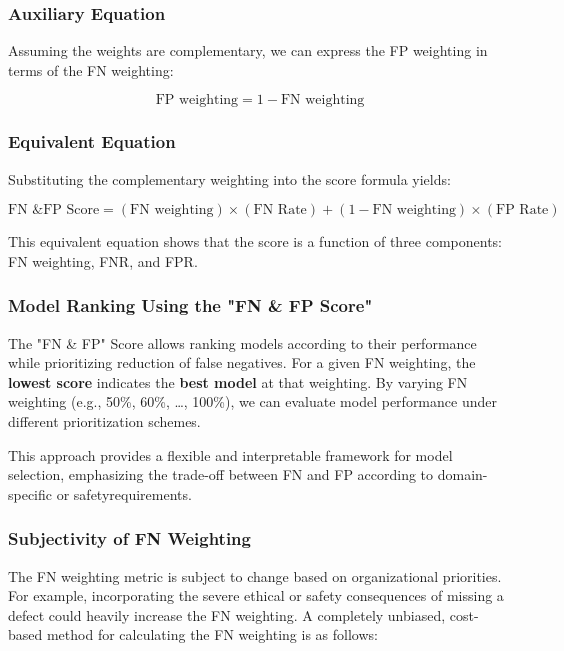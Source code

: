 \documentclass{article}
\begin{document}
\subsubsection{Auxiliary Equation}
Assuming the weights are complementary, we can express the FP weighting in terms of the FN weighting:

\begin{equation}
\text{FP weighting} = 1 - \text{FN weighting}
\end{equation}

\subsubsection{Equivalent Equation}
Substituting the complementary weighting into the score formula yields:

\begin{equation}
\text{FN \& FP Score} = (\text{FN weighting}) \times (\text{FN Rate}) + (1 - \text{FN weighting}) \times (\text{FP Rate})
\end{equation}

This equivalent equation shows that the score is a function of three components: FN weighting, FNR, and FPR.


\subsubsection{Model Ranking Using the "FN \& FP Score"}
The "FN \& FP" Score allows ranking models according to their performance while prioritizing reduction of false negatives. For a given FN weighting, the \textbf{lowest score} indicates the \textbf{best model} at that weighting.
By varying FN weighting (e.g., 50\%, 60\%, …, 100\%), we can evaluate model performance under different prioritization schemes.


This approach provides a flexible and interpretable framework for model selection, emphasizing the trade-off between FN and FP according to domain-specific or safetyrequirements.
 
\subsubsection{Subjectivity of FN Weighting}

The FN weighting metric is subject to change based on organizational priorities. For example, incorporating the severe ethical or safety consequences of missing a defect could heavily increase the FN weighting. A completely unbiased, cost-based method for calculating the FN weighting is as follows:
\end{document}
